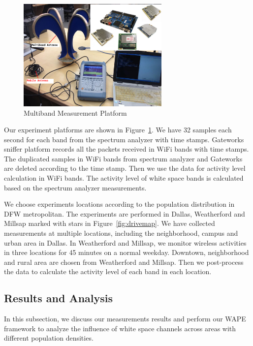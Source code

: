   \begin{figure}
  \centering
  \includegraphics[width=74mm]{figures/equipment}
  \vspace{-0.1in}
  \caption{Multiband Measurement Platform}
  \label{fig:equipment}
  \vspace{-0.15in}
  \end{figure}
  
Our experiment platforms are shown in Figure~\ref{fig:equipment}.
We have 32 samples each second for each band from the spectrum analyzer with time stamps.
Gateworks sniffer platform records all the packets received in WiFi bands with time stamps. 
The duplicated samples in WiFi bands from spectrum analyzer and Gateworks are deleted 
according to the time stamp. Then we use the data for activity level calculation in WiFi bands. 
The activity level of white space bands is calculated based on the spectrum analyzer measurements.  

We choose experiments locations according to the population distribution in DFW metropolitan. 
The experiments are performed in Dallas, Weatherford and Millsap marked with stars in 
Figure~\ref{fig:drivemap}.
We have collected measurements at multiple locations, including the neighborhood, campus and 
urban area in Dallas.
In Weatherford and Millsap, we monitor wireless activities in three locations for 45 minutes
on a normal weekday. 
Downtown, neighborhood and rural area are chosen from Weatherford and Millsap. 
Then we post-process the data to calculate the activity level of each band in each location.


\subsection{Results and Analysis} 
\label{subsec:result}
In this subsection, we discuss our measurements results and perform our WAPE framework 
to analyze the influence of white space channels across areas with different population densities.

